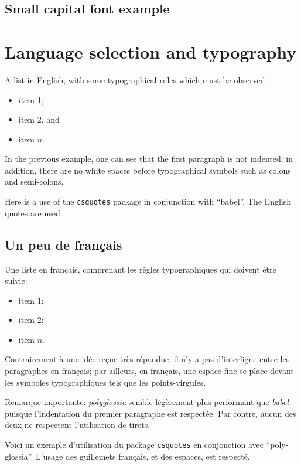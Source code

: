 \documentclass[11pt, a4paper]{report}
\begin{document}
		\textbf{\textit{\lipsum[1]}}
		
	
	\section{Small capital font example}
	
		\textsc{\lipsum[1]}
	

\chapter{Language selection and typography}

	A list in English, with some typographical rules which must be observed:
	\begin{itemize}
		\item item 1,
		\item item 2, and
		\item item $n$.
	\end{itemize}
	
	In the previous example, one can see that the first paragraph is not indented; in addition, there are no white spaces before typographical symbols such as colons and semi-colons.
	
	Here is a use of the \texttt{csquotes} package in conjunction with \enquote{babel}. The English quotes are used. 
	
	
	\begin{french}%
		\section{Un peu de français}
		
		Une liste en français, comprenant les règles typographiques qui doivent être suivie:
		\begin{itemize}
			\item item 1;
			\item item 2;
			\item item $n$.
		\end{itemize}
		
		Contrairement à une idée reçue très répandue, il n'y a pas d'interligne entre les paragraphes en français; par ailleurs, en français, une espace fine se place devant les symboles typographiques tels que les points-virgules.
		
		Remarque importante: \textit{polyglossia} semble légèrement plus performant que \textit{babel} puisque l'indentation du premier paragraphe est respectée. Par contre, aucun des deux ne respectent l'utilisation de tirets.
		
		Voici un exemple d'utilisation du package \texttt{csquotes} en conjonction avec \enquote{polyglossia}. L'usage des guillemets français, et des espaces, est respecté.
	\end{french}

\end{document}

